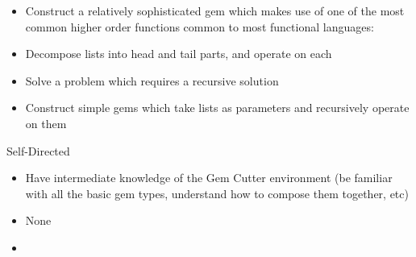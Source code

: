 
	{
		\begin{itemize}
			\item Construct a relatively sophisticated gem which makes use of one of the most common higher order functions common to most functional languages: 
			\item Decompose lists into head and tail parts, and operate on each
			\item Solve a problem which requires a recursive solution
			\item Construct simple gems which take lists as parameters and recursively operate on them
		\end{itemize}
	}
	{Self-Directed}
	{
		\begin{itemize}
			\item Have intermediate knowledge of the Gem Cutter environment (be familiar with all the basic gem types, understand how to compose them together, etc)
		\end{itemize}
	}
	{
		\begin{itemize}
			\item None
		\end{itemize}
	}
	{
		\begin{itemize}
			\item
		\end{itemize}
	}	
